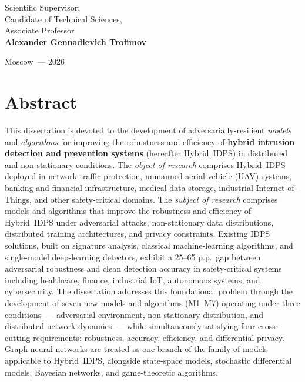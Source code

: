 \begin{titlepage}
\begin{center}
\end{center}

\vspace{1.4cm}

\hfill
\begin{minipage}{0.55\textwidth}
\small
Scientific Supervisor:\\
Candidate of Technical Sciences,\\
Associate Professor\\
\textbf{Alexander Gennadievich Trofimov}
\end{minipage}

\vfill

\begin{center}
Moscow~--- 2026
\end{center}
\end{titlepage}

\chapter*{Abstract}

This dissertation is devoted to the development of adversarially-resilient \emph{models} and \emph{algorithms} for improving the robustness and efficiency of \textbf{hybrid intrusion detection and prevention systems} (hereafter Hybrid~IDPS) in distributed and non-stationary conditions. The \emph{object of research} comprises Hybrid~IDPS deployed in network-traffic protection, unmanned-aerial-vehicle (UAV) systems, banking and financial infrastructure, medical-data storage, industrial Internet-of-Things, and other safety-critical domains. The \emph{subject of research} comprises models and algorithms that improve the robustness and efficiency of Hybrid~IDPS under adversarial attacks, non-stationary data distributions, distributed training architectures, and privacy constraints. Existing IDPS solutions, built on signature analysis, classical machine-learning algorithms, and single-model deep-learning detectors, exhibit a 25--65 p.p.\ gap between adversarial robustness and clean detection accuracy in safety-critical systems including healthcare, finance, industrial IoT, autonomous systems, and cybersecurity. The dissertation addresses this foundational problem through the development of seven new models and algorithms (M1--M7) operating under three conditions~--- adversarial environment, non-stationary distribution, and distributed network dynamics~--- while simultaneously satisfying four cross-cutting requirements: robustness, accuracy, efficiency, and differential privacy. Graph neural networks are treated as one branch of the family of models applicable to Hybrid~IDPS, alongside state-space models, stochastic differential models, Bayesian networks, and game-theoretic algorithms.

